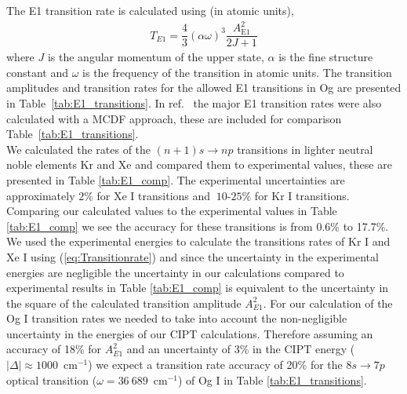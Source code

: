 \documentclass[8pt,a4paper, twoside]{report}
\begin{document}
The E1 transition rate is calculated using (in atomic units),
\begin{align} \label{eq:Transitionrate}
T_{E1} = \dfrac{4}{3}\left(\alpha \omega\right)^3\dfrac{ A_{\text{E1}}^2}{2J + 1}
\end{align}
where $J$ is the angular momentum of the upper state, $\alpha$ is the fine structure constant and $\omega$ is the frequency of the transition in atomic units. The transition amplitudes and transition rates for the allowed E1 transitions in Og are presented in Table~\ref{tab:E1_transitions}. In ref.~\cite{Indelicato2007} the major E1 transition rates were also calculated with a MCDF approach, these are included for comparison Table~\ref{tab:E1_transitions}. \\
\linebreak
We calculated the  rates of the $(n+1)s \rightarrow np$ transitions in lighter neutral noble elements Kr and Xe  and compared them to experimental values, these are presented in Table \ref{tab:E1_comp}. The experimental uncertainties are approximately $2\%$ for Xe I transitions \cite{Xe_BSD} and $~10$-$25\%$ for Kr I transitions\cite{Kr_BSD}. Comparing our calculated values to the experimental values in Table \ref{tab:E1_comp} we see the accuracy for these transitions is from 0.6\% to 17.7\%. We used the experimental energies to calculate the transitions rates of Kr I and Xe I using (\ref{eq:Transitionrate}) and since the uncertainty in the experimental energies are negligible the uncertainty in our calculations compared to experimental results in Table \ref{tab:E1_comp} is equivalent to the uncertainty in the square of the calculated transition amplitude $A_{E1}^2$. For our calculation of the Og I transition rates we needed to take into account the non-negligible uncertainty in the energies of our CIPT calculations.  Therefore assuming an accuracy of 18\% for $A_{E1}^2$ and an uncertainty of 3\% in the CIPT energy ($\left|\Delta\right| \approx 1000$~cm$^{-1}$) we expect a transition rate accuracy of 20\% for the $8s \rightarrow 7p$ optical transition ($\omega = 36~689$~cm$^{-1}$) of Og I in Table \ref{tab:E1_transitions}.  \\
\end{document}
